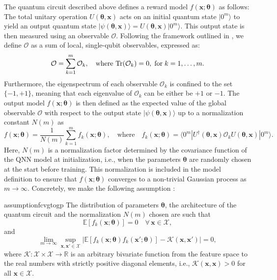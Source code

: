 \documentclass[pdflatex,sn-mathphys-num]{sn-jnl}%
\theoremstyle{thmstyleone}%
\theoremstyle{thmstyletwo}%
\theoremstyle{thmstylethree}%
\newcommand{\xbf}{\mathbf{x}}
\newcommand{\thetabf}{\bm{\theta}}
\begin{document}
The quantum circuit described above defines a reward model $f(\xbf;\thetabf)$ as follows: The total unitary operation $U(\thetabf,\xbf)$ acts on an initial quantum state $\vert 0^m \rangle$ to yield an output quantum state $\vert \psi(\thetabf,\xbf)\rangle= U(\thetabf,\xbf)\vert 0^m \rangle$. This output state is then measured using an observable $\mathcal{O}$. Following the framework outlined in \cite{Girardi2025}, we define $\mathcal{O}$ as a sum of local, single-qubit observables, expressed as:
\[
\mathcal{O} = \sum_{k=1}^m \mathcal{O}_k, \quad \text{where } \text{Tr}(\mathcal{O}_k) = 0,  \hspace{0.1cm}\mbox{for} \hspace{0.1cm} k=1,\hdots,m.
\]
Furthermore, the eigenspectrum of each observable $\mathcal{O}_k$ is confined to the set $\{-1, +1\}$, meaning that each eigenvalue of  $\mathcal{O}_k$  can be either be $+1$ or $-1$.
The output model $f(\xbf; {\thetabf})$ is  then  defined as the expected value of the global observable $\mathcal{O}$ with respect to the output state $\vert \psi(\thetabf,\xbf)\rangle$ up to a normalization constant $N(m)$ as
\begin{equation}\label{eq:qnn-model}
f(\xbf; {\thetabf}) = \frac{1}{N(m)} \sum_{k=1}^m f_k( \xbf;{\thetabf}), \quad \text{where} \quad f_k(\xbf;{\thetabf}) = \langle 0^m | U^\dagger({\thetabf}, \xbf) \mathcal{O}_k U({\thetabf}, \xbf) | 0^m \rangle.
\end{equation} 
Here, $N(m)$ is a normalization factor determined by the covariance function of the QNN model at initialization, i.e., when the parameters $\thetabf$ are randomly chosen at the start  before training. This normalization is included in the model definition to ensure that $f(\xbf;\thetabf)$ converges to a non-trivial Gaussian process as $m \to \infty$. Concretely, we make the following assumption \cite{Girardi2025}:

\begin{restatable}{assumption}{fcvgtogp} \label{fcvgtogp}
The distribution of parameters $\bm{\theta}$, the architecture of the quantum circuit and the
normalization $N(m)$ chosen are such that $$
\mathbb E[f_k(\xbf;\bm{\theta})] = 0  \quad\forall\, \xbf \in \mathcal{X},
$$ %
and
$$
\lim_{m\rightarrow \infty} \sup_{\xbf,\xbf' \in \mathcal X} \left| \mathbb E[f_k(\xbf;\bm{\theta})f_k(\xbf';\bm{\theta})] - \mathcal K(\xbf,\xbf') \right| = 0,
$$
where $\mathcal K:\mathcal{X} \times \mathcal{X} \rightarrow \mathbb R$ is an arbitrary bivariate function from the feature space to the real
numbers with strictly positive diagonal elements, i.e., $\mathcal K(\xbf,\xbf)>0$ for all  $\xbf \in \mathcal X$. %
\end{restatable} 
\end{document}
